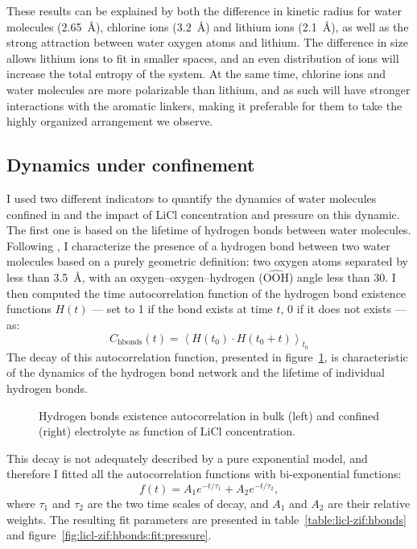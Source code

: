 \documentclass[thesis]{subfiles}
\begin{document}
These results can be explained by both the difference in kinetic
radius\cite{Marcus1988} for water molecules (\SI{2.65}{\AA}), chlorine
ions (\SI{3.2}{\AA}) and lithium ions (\SI{2.1}{\AA}), as well as
the strong attraction between water oxygen atoms and lithium. The difference in
size allows lithium ions to fit in smaller spaces, and an even distribution of
ions will increase the total entropy of the system. At the same time, chlorine
ions and water molecules are more polarizable than lithium, and as such will
have stronger interactions with the aromatic linkers, making it preferable for
them to take the highly organized arrangement we observe.

\FloatBarrier
\subsection{Dynamics under confinement}

I used two different indicators to quantify the dynamics of water molecules
confined in  and the impact of LiCl concentration and pressure on this
dynamic. The first one is based on the lifetime of hydrogen bonds between water
molecules. Following \citeauthor{Luzar1996}\cite{Luzar1996}, I characterize the
presence of a hydrogen bond between two water molecules based on a purely
geometric definition: two oxygen atoms separated by less than \SI{3.5}{\AA},
with an oxygen--oxygen--hydrogen ($\widehat{\text{OOH}}$) angle less than
30\textdegree. I then computed the time autocorrelation function of the hydrogen
bond existence functions $H(t)$ --- set to 1 if the bond exists at time $t$, 0
if it does not exists --- as:
\[C_{\text{hbonds}}(t) = \left\langle H(t_0) \cdot H(t_0 + t) \right\rangle_{t_0} \]
The decay of this autocorrelation function, presented in
figure~\ref{fig:licl-zif:hbonds}, is characteristic of the dynamics of the
hydrogen bond network and the lifetime of individual hydrogen bonds.

\begin{figure}[ht]
    \centering
    
    \caption{Hydrogen bonds existence autocorrelation in bulk (left) and
    confined (right) electrolyte as function of LiCl concentration.}
    \label{fig:licl-zif:hbonds}
\end{figure}

This decay is not adequately described by a pure exponential model, and
therefore I fitted all the autocorrelation functions with bi-exponential
functions:
\[ f(t) = A_1 e^{-t / \tau_1} + A_2 e^{-t / \tau_2}, \]
where $\tau_1$ and $\tau_2$ are the two time scales of decay, and $A_1$ and
$A_2$ are their relative weights. The resulting fit parameters are presented in
table~\ref{table:licl-zif:hbonds} and figure~\ref{fig:licl-zif:hbonds:fit:pressure}.
\end{document}

